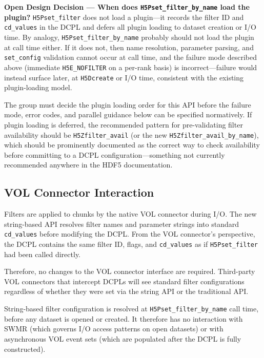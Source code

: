 \documentclass[../HDF5_RFC.tex]{subfiles}
\begin{document}

\noindent\colorbox{yellow!25}{\parbox{\dimexpr\linewidth-2\fboxsep}{%
  \textbf{Open Design Decision --- When does \texttt{H5Pset\_filter\_by\_name} load the plugin?}
  \texttt{H5Pset\_filter} does not load a plugin---it records the filter ID and
  \texttt{cd\_values} in the DCPL and defers all plugin loading to dataset creation
  or I/O time.  By analogy, \texttt{H5Pset\_filter\_by\_name} probably should not load
  the plugin at call time either.  If it does not, then name resolution,
  parameter parsing, and \texttt{set\_config} validation cannot occur at call time,
  and the failure mode described above (immediate \texttt{H5E\_NOFILTER} on a
  per-rank basis) is incorrect---failure would instead surface later, at
  \texttt{H5Dcreate} or I/O time, consistent with the existing plugin-loading model.

  The group must decide the plugin loading order for this API before the
  failure mode, error codes, and parallel guidance below can be specified
  normatively.  If plugin loading is deferred, the recommended pattern for
  pre-validating filter availability should be \texttt{H5Zfilter\_avail} (or the
  new \texttt{H5Zfilter\_avail\_by\_name}), which should be prominently documented
  as the correct way to check availability before committing to a DCPL
  configuration---something not currently recommended anywhere in the HDF5
  documentation.
}}

\subsection{VOL Connector Interaction}

Filters are applied to chunks by the native VOL connector during I/O. The new
string-based API resolves filter names and parameter strings into standard
\texttt{cd\_values} before modifying the DCPL. From the VOL connector's perspective,
the DCPL contains the same filter ID, flags, and \texttt{cd\_values} as if
\texttt{H5Pset\_filter} had been called directly.

Therefore, no changes to the VOL connector interface are required. Third-party
VOL connectors that intercept DCPLs will see standard filter configurations
regardless of whether they were set via the string API or the traditional API.

String-based filter configuration is resolved at \texttt{H5Pset\_filter\_by\_name}
call time, before any dataset is opened or created. It therefore has no
interaction with SWMR (which governs I/O access patterns on open datasets) or
with asynchronous VOL event sets (which are populated after the DCPL is fully
constructed).
\end{document}
